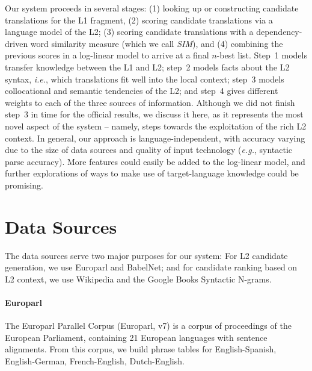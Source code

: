 \documentclass[11pt]{article}
\begin{document}
Our system proceeds in several stages: (1) looking up or constructing candidate
translations for the L1 fragment, (2) scoring candidate translations via a
language model of the L2; (3) scoring candidate translations with a
dependency-driven word similarity measure \cite{lin:98} (which we call
\textit{SIM}), and (4) combining the previous scores in a log-linear model to
arrive at a final $n$-best list.  Step~1 models transfer knowledge between the L1
and L2; step~2 models facts about the L2 syntax, \emph{i.e.}, which
translations fit well into the local context; step~3 models collocational and
semantic tendencies of the L2; and step~4 gives different weights to each of
the three sources of information.  Although we did not finish step~3 in time
for the official results, we discuss it here, as it represents the most novel
aspect of the system -- namely, steps towards the exploitation of the rich L2
context. In general, our approach is language-independent, with accuracy
varying due to the size of data sources and quality of input technology
(\emph{e.g.}, syntactic parse accuracy). More features could easily be added to
the log-linear model, and further explorations of ways to make use of
target-language knowledge could be promising.

\section{Data Sources}
The data sources serve two major purposes for our system: For L2 candidate generation, we use Europarl and BabelNet; and for candidate ranking based on L2 context, we use Wikipedia and the Google Books Syntactic N-grams. 

\paragraph{Europarl}  %
The Europarl Parallel Corpus (Europarl, v7) \cite{koehn:05} is a corpus of proceedings of the European Parliament, containing 21 European languages with sentence alignments.
From this corpus, we build phrase tables for English-Spanish, English-German, French-English, Dutch-English.
\end{document}
